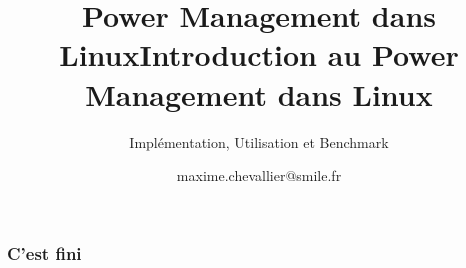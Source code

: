 \documentclass{smilebeamer}
\title{Power Management dans Linux}
\author{maxime.chevallier@smile.fr}
\begin{document}
\begin{frame}[plain]
    \title{Introduction au Power Management dans Linux}
    \subtitle{Implémentation, Utilisation et Benchmark}
    \titlepage
\end{frame}





\begin{frame}
	\frametitle{C'est fini}
\end{frame}
\end{document}

